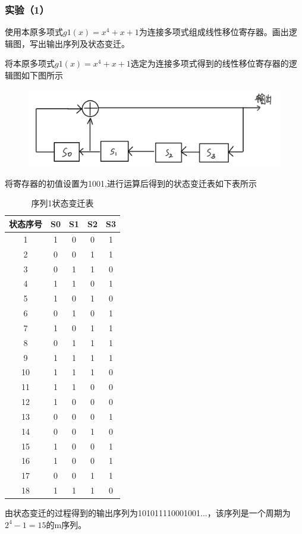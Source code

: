 \documentclass[a4paper,11pt,UTF8]{ctexart}
\newcommand{\bottomcaption}{%
\setlength{\abovecaptionskip}{6pt}%
\setlength{\belowcaptionskip}{6pt}%
\caption}
\newcommand{\xiaowuhao}{\fontsize{9pt}{\baselineskip}\selectfont}   %
\begin{document}
    \subsubsection{实验（1）}
      使用本原多项式$g1(x)=x^{4} +x +1$为连接多项式组成线性移位寄存器。画出逻辑图，写出输出序列及状态变迁。\par
      将本原多项式$g1(x)=x^{4} +x +1$选定为连接多项式得到的线性移位寄存器的逻辑图如下图所示
      \begin{figure}[H]
        \centering
        \includegraphics[width=13cm]{线性移位寄存器1.jpg}
        \bottomcaption{\xiaowuhao{线性移位寄存器1}}
      \end{figure}
\newpage
      将寄存器的初值设置为1001,进行运算后得到的状态变迁表如下表所示\par
      \begin{table}[h!]
        \begin{center}
          \caption{序列1状态变迁表}
          \begin{tabular}{c|c|c|c|c} %
            \textbf{状态序号} & \textbf{S0} & \textbf{S1} & \textbf{S2} & \textbf{S3} \\
            \hline
            1  & 1 & 0 & 0 & 1 \\
            2  & 0 & 0 & 1 & 1 \\
            3  & 0 & 1 & 1 & 0\\
            4  & 1 & 1 & 0 & 1\\
            5  & 1 & 0 & 1 & 0\\
            6  & 0 & 1 & 0 & 1\\
            7  & 1 & 0 & 1 & 1\\
            8  & 0 & 1 & 1 & 1\\
            9  & 1 & 1 & 1 & 1\\
            10 & 1 & 1 & 1 & 0\\
            11 & 1 & 1 & 0 & 0\\
            12 & 1 & 0 & 0 & 0\\
            13 & 0 & 0 & 0 & 1\\
            14 & 0 & 0 & 1 & 0\\
            15 & 1 & 0 & 0 & 1\\
            16 & 1 & 0 & 0 & 1\\
            17 & 0 & 0 & 1 & 1\\
            18 & 1 & 1 & 1 & 0\\
          \end{tabular}
        \end{center}
      \end{table}
      由状态变迁的过程得到的输出序列为101011110001001...，该序列是一个周期为$2^{4}-1=15$的m序列。
\end{document}
